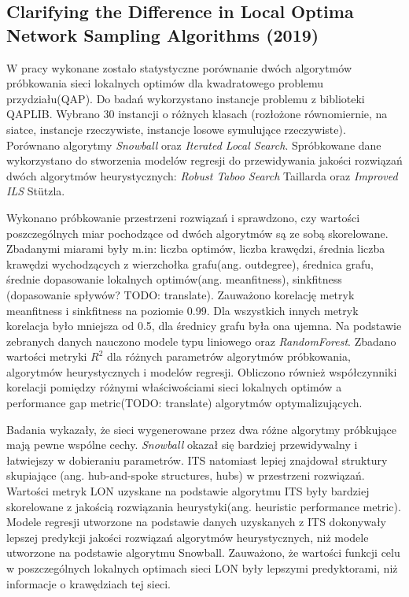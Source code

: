 \subsection*{Clarifying the Difference in Local Optima Network Sampling Algorithms (2019) \cite{DBLP:conf/evoW/ThomsonOV19}}
W pracy wykonane zostało statystyczne porównanie dwóch algorytmów próbkowania
sieci lokalnych optimów dla kwadratowego problemu przydziału(QAP).
Do badań wykorzystano instancje problemu z biblioteki QAPLIB.
Wybrano 30 instancji o różnych klasach (rozłożone równomiernie, na siatce,
instancje rzeczywiste, instancje losowe symulujące rzeczywiste).
Porównano algorytmy \textit{Snowball} oraz \textit{Iterated Local Search}.
Spróbkowane dane wykorzystano do stworzenia modelów regresji do przewidywania jakości rozwiązań
dwóch algorytmów heurystycznych: \textit{Robust Taboo Search} Taillarda oraz \textit{Improved ILS} Stützla.

Wykonano próbkowanie przestrzeni rozwiązań i sprawdzono, czy wartości poszczególnych miar pochodzące od dwóch algorytmów
są ze sobą skorelowane.
Zbadanymi miarami były m.in: liczba optimów, liczba krawędzi, średnia liczba krawędzi wychodzących z wierzchołka grafu(ang. outdegree),
średnica grafu, średnie dopasowanie lokalnych optimów(ang. meanfitness), sinkfitness (dopasowanie spływów? TODO: translate).
Zauważono korelację metryk meanfitness i sinkfitness  na poziomie 0.99.
Dla wszystkich innych metryk korelacja było mniejsza od 0.5, dla średnicy grafu była ona ujemna.
Na podstawie zebranych danych nauczono modele typu liniowego oraz \textit{RandomForest}.
Zbadano wartości metryki $R^{2}$ dla różnych parametrów algorytmów próbkowania, algorytmów heurystycznych
i modelów regresji.
Obliczono również współczynniki korelacji pomiędzy różnymi właściwościami sieci lokalnych optimów
a performance gap metric(TODO: translate) algorytmów optymalizujących.

Badania wykazały, że sieci wygenerowane przez dwa różne algorytmy próbkujące mają pewne wspólne cechy.
\textit{Snowball} okazał się bardziej przewidywalny i łatwiejszy w dobieraniu parametrów.
ITS natomiast lepiej znajdował struktury skupiające (ang. hub-and-spoke structures, hubs) w przestrzeni rozwiązań.
Wartości metryk LON uzyskane na podstawie algorytmu ITS były bardziej skorelowane z
jakością rozwiązania heurystyki(ang. heuristic performance metric).
Modele regresji utworzone na podstawie danych uzyskanych z ITS dokonywały lepszej predykcji
jakości rozwiązań algorytmów heurystycznych, niż modele utworzone na podstawie algorytmu Snowball.
Zauważono, że wartości funkcji celu w poszczególnych lokalnych optimach sieci LON
były lepszymi predyktorami, niż informacje o krawędziach tej sieci.

